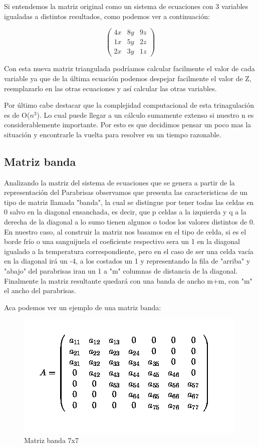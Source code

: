 Si entendemos la matriz original como un sistema de ecuaciones con 3 variables igualadas a distintos resultados, como podemos ver a continuación:

\[ \left( \begin{array}{ccc}
4x & 8y & 9z \\
1x & 5y & 2z \\
2x & 3y & 1z \end{array} \right)\] 

Con esta nueva matriz triangulada podríamos calcular facilmente el valor de cada variable ya que de la última ecuación podemos despejar facilmente el valor de Z, reemplazarlo en las otras ecuaciones y así calcular las otras variables.


\newpage

Por último cabe destacar que la complejidad computacional de esta trinagulación es de O($n^3$). Lo cual puede llegar a un cálculo sumamente extenso si nuestro n es considerablemente importante. Por esto es que decidimos pensar un poco mas la situación y encontrarle la vuelta para resolver en un tiempo razonable.

\subsection{Matriz banda}

Analizando la matriz del sistema de ecuaciones que se genera a partir de la representación del Parabrisas observamos que presenta las caracteristicas de un tipo de matriz llamada "banda", la cual se distingue por tener todas las celdas en 0 salvo en la diagonal ensanchada, es decir, que p celdas a la izquierda y q a la derecha de la diagonal a lo sumo tienen algunos o todos los valores distintos de 0. En nuestro caso, al construir la matriz nos basamos en el tipo de celda, si es el borde frío o una sanguijuela el coeficiente respectivo sera un 1 en la diagonal igualado a la temperatura correspondiente, pero en el caso de ser una celda vacía en la diagonal irá un -4, a los costados un 1 y representando la fila de "arriba" y "abajo" del parabrisas iran un 1 a "m" columnas de distancia de la diagonal. Finalmente la matriz resultante quedará con una banda de ancho m+m, con "m" el ancho del parabrisas.

Aca podemos ver un ejemplo de una matriz banda:

\begin{figure}[htb]
\begin{center}
\includegraphics[scale=0.70]{imagenes/matriz_banda.jpg} 
\caption{Matriz banda 7x7} 
\end{center}
\end{figure}







